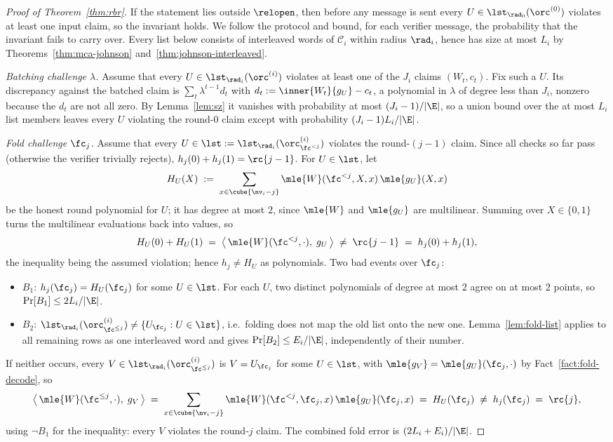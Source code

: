 \begin{proof}[Proof of Theorem~\ref{thm:rbr}]
If the statement lies outside $\relopen$, then before any message is sent every $U \in \lst_{\rad_0}(\orc^{(0)})$ violates at least one input claim, so the invariant holds. We follow the protocol and bound, for each verifier message, the probability that the invariant fails to carry over. Every list below consists of interleaved words of $\mathcal{C}_i$ within radius $\rad_i$, hence has size at most $L_i$ by Theorems~\ref{thm:mca-johnson} and~\ref{thm:johnson-interleaved}.

\medskip\noindent\emph{Batching challenge $\lambda$.}
Assume that every $U \in \lst_{\rad_i}(\orc^{(i)})$ violates at least one of the $J_i$ claims $(W_t, c_t)$. Fix such a $U$. Its discrepancy against the batched claim is $\sum_{t} \lambda^{t - 1} d_t$ with $d_t := \inner{W_t}{g_U} - c_t$, a polynomial in $\lambda$ of degree less than $J_i$, nonzero because the $d_t$ are not all zero. By Lemma~\ref{lem:sz} it vanishes with probability at most $(J_i - 1)/|\E|$, so a union bound over the at most $L_i$ list members leaves every $U$ violating the round-$0$ claim except with probability $(J_i - 1) L_i / |\E|$.

\medskip\noindent\emph{Fold challenge $\fc_j$.}
Assume that every $U \in \lst := \lst_{\rad_i}(\orc^{(i)}_{\fc^{<j}})$ violates the round-$(j{-}1)$ claim. Since all checks so far pass (otherwise the verifier trivially rejects), $h_j(0) + h_j(1) = \rc{j-1}$. For $U \in \lst$, let
\[
H_U(X) \;:=\; \sum_{x \in \cube{\nv_i - j}} \mle{W}(\fc^{<j}, X, x)\, \mle{g_U}(X, x)
\]
be the honest round polynomial for $U$; it has degree at most $2$, since $\mle{W}$ and $\mle{g_U}$ are multilinear. Summing over $X \in \{0, 1\}$ turns the multilinear evaluations back into values, so
\[
H_U(0) + H_U(1) \;=\; \bigl\langle\, \mle{W}(\fc^{<j}, \cdot),\; g_U \,\bigr\rangle \;\neq\; \rc{j-1} \;=\; h_j(0) + h_j(1),
\]
the inequality being the assumed violation; hence $h_j \neq H_U$ as polynomials. Two bad events over $\fc_j$:
\begin{itemize}[itemsep=1pt]
\item $B_1$: $h_j(\fc_j) = H_U(\fc_j)$ for some $U \in \lst$. For each $U$, two distinct polynomials of degree at most $2$ agree on at most $2$ points, so $\Pr[B_1] \le 2 L_i / |\E|$.
\item $B_2$: $\lst_{\rad_i}(\orc^{(i)}_{\fc^{\le j}}) \neq \{ U_{\fc_j} : U \in \lst \}$, i.e.\ folding does not map the old list onto the new one. Lemma~\ref{lem:fold-list} applies to all remaining rows as one interleaved word and gives $\Pr[B_2] \le E_i/|\E|$, independently of their number.
\end{itemize}
If neither occurs, every $V \in \lst_{\rad_i}(\orc^{(i)}_{\fc^{\le j}})$ is $V = U_{\fc_j}$ for some $U \in \lst$, with $\mle{g_V} = \mle{g_U}(\fc_j, \cdot)$ by Fact~\ref{fact:fold-decode}, so
\[
\bigl\langle\, \mle{W}(\fc^{\le j}, \cdot),\; g_V \,\bigr\rangle
\;=\; \sum_{x \in \cube{\nv_i - j}} \mle{W}(\fc^{<j}, \fc_j, x)\, \mle{g_U}(\fc_j, x)
\;=\; H_U(\fc_j) \;\neq\; h_j(\fc_j) \;=\; \rc{j} ,
\]
using $\neg B_1$ for the inequality: every $V$ violates the round-$j$ claim. The combined fold error is $(2 L_i+E_i)/|\E|$.


\end{proof}
